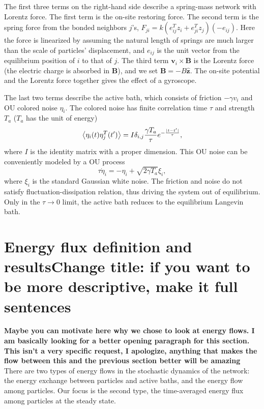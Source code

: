 \documentclass[
 preprint,
 preprintnumbers,
 amsmath,amssymb,
 aps,
 pre,
 longbibliography,
 10pt, twocolumn
]{revtex4-1}
\begin{document}
The first three terms on the right-hand side describe a spring-mass network with Lorentz force. 
The first term is the on-site restoring force.
The second term is the spring force from the bonded neighbors $j$'s,
$F_{ji} = k (e_{ij}^T z_i + e_{ji}^T z_j) (-e_{ij})$.
Here the force is linearized by assuming the natural length of springs are much larger than the scale of particles' displacement, and $e_{ij}$ is the unit vector from the equilibrium position of $i$ to that of $j$.
The third term $\bm{v}_i\times\bm{B}$ is the Lorentz force (the electric charge is absorbed in $\bm{B}$), and we set $\bm{B} = -B\mathbf{\hat{z}}$. 
The on-site potential and the Lorentz force together gives the effect of a gyroscope.

The last two terms describe the active bath, which consists of friction $-\gamma v_i$ and OU colored noise $\eta_i$.
The colored noise has finite correlation time $\tau$ and strength $T_a$ ($T_a$ has the unit of energy)
\begin{equation} \label{eqn:noise_correlation}
\expval{\eta_i(t)\eta_{j}^T(t')} = I\delta_{i,j}\frac{\gamma T_a}{\tau} e^{-\frac{|t-t'|}{\tau}} ,
\end{equation}
where $I$ is the identity matrix with a proper dimension.
This OU noise can be conveniently modeled by a OU process \cite{Hanggi1994ColoredSystems}
\begin{equation} \label{eqn:noise_eom}
\tau \dot{\eta}_i = -\eta_i + \sqrt{2\gamma T_a}\xi_i ,
\end{equation}
where $\xi_i$ is the standard Gaussian white noise.
The friction and noise do not satisfy fluctuation-dissipation relation, thus driving the system out of equilibrium.
Only in the $\tau \rightarrow 0$ limit, the active bath reduces to the equilibrium Langevin bath.


\section{Energy flux definition and results{\bf Change title: if you want to be more descriptive, make it full sentences}} \label{sec:flux}
{\bf Maybe you can motivate here why we chose to look at energy flows. I am basically looking for a better opening paragraph for this section. This isn't a very specific request, I apologize, anything that makes the flow between this and the previous section better will be amazing}
There are two types of energy flows in the stochastic dynamics of the network: the energy exchange between particles and active baths, and the energy flow among particles.
Our focus is the second type, the time-averaged energy flux among particles at the steady state.
\end{document}
